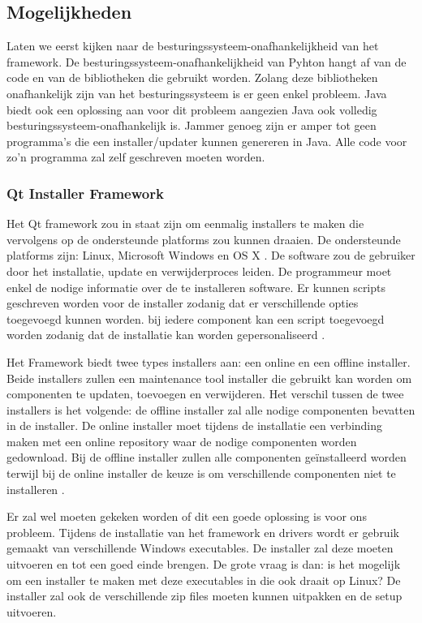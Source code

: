 \documentclass{article}
\begin{document}
\subsection{Mogelijkheden}\label{section:mogelijkheden}
Laten we eerst kijken naar de besturingssysteem-onafhankelijkheid van het framework.
De besturingssysteem-onafhankelijkheid van Pyhton hangt af van de code en van de bibliotheken die gebruikt worden.
Zolang deze bibliotheken onafhankelijk zijn van het besturingssysteem is er geen enkel probleem.
Java biedt ook een oplossing aan voor dit probleem aangezien Java ook volledig besturingssysteem-onafhankelijk is.
Jammer genoeg zijn er amper tot geen programma's die een installer/updater kunnen genereren in Java.
Alle code voor zo'n programma zal zelf geschreven moeten worden.

\subsubsection{Qt Installer Framework \citep{qtDoc}}
Het Qt framework zou in staat zijn om eenmalig installers te maken die vervolgens op de ondersteunde platforms zou kunnen draaien.
De ondersteunde platforms zijn: Linux, Microsoft Windows en OS X \citep{qtOverview}.
De software zou de gebruiker door het installatie, update en verwijderproces leiden.
De programmeur moet enkel de nodige informatie over de te installeren software.
Er kunnen scripts geschreven worden voor de installer zodanig dat er verschillende opties toegevoegd kunnen worden.
bij iedere component kan een script toegevoegd worden zodanig dat de installatie kan worden gepersonaliseerd \citep{qtDocScript}.

Het Framework biedt twee types installers aan: een online en een offline installer.
Beide installers zullen een maintenance tool installer die gebruikt kan worden om componenten te updaten, toevoegen en verwijderen.
Het verschil tussen de twee installers is het volgende: de offline installer zal alle nodige componenten bevatten in de installer.
De online installer moet tijdens de installatie een verbinding maken met een online repository waar de nodige componenten worden gedownload. 
Bij de offline installer zullen alle componenten ge\"installeerd worden terwijl bij de online installer de keuze is om verschillende componenten niet te installeren \citep{qtOverview}.

Er zal wel moeten gekeken worden of dit een goede oplossing is voor ons probleem.
Tijdens de installatie van het framework en drivers wordt er gebruik gemaakt van verschillende Windows executables. 
De installer zal deze moeten uitvoeren en tot een goed einde brengen.
De grote vraag is dan: is het mogelijk om een installer te maken met deze executables in die ook draait op Linux?
De installer zal ook de verschillende zip files moeten kunnen uitpakken en de setup uitvoeren.
\end{document}
